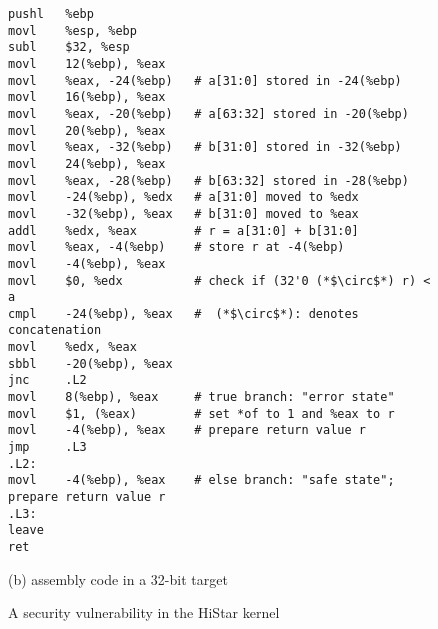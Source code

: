 \begin{figure}
\begin{lstlisting}
pushl   %ebp
movl    %esp, %ebp
subl    $32, %esp
movl    12(%ebp), %eax
movl    %eax, -24(%ebp)   # a[31:0] stored in -24(%ebp)
movl    16(%ebp), %eax
movl    %eax, -20(%ebp)   # a[63:32] stored in -20(%ebp)
movl    20(%ebp), %eax
movl    %eax, -32(%ebp)   # b[31:0] stored in -32(%ebp)
movl    24(%ebp), %eax
movl    %eax, -28(%ebp)   # b[63:32] stored in -28(%ebp)
movl    -24(%ebp), %edx   # a[31:0] moved to %edx
movl    -32(%ebp), %eax   # b[31:0] moved to %eax
addl    %edx, %eax        # r = a[31:0] + b[31:0]
movl    %eax, -4(%ebp)    # store r at -4(%ebp)
movl    -4(%ebp), %eax
movl    $0, %edx          # check if (32'0 (*$\circ$*) r) < a
cmpl    -24(%ebp), %eax   #  (*$\circ$*): denotes concatenation
movl    %edx, %eax
sbbl    -20(%ebp), %eax
jnc     .L2               
movl    8(%ebp), %eax     # true branch: "error state"
movl    $1, (%eax)        # set *of to 1 and %eax to r
movl    -4(%ebp), %eax    # prepare return value r
jmp     .L3
.L2:                  
movl    -4(%ebp), %eax    # else branch: "safe state"; prepare return value r
.L3:
leave
ret
\end{lstlisting}
\begin{center}
{\small (b) \ISA assembly code in a 32-bit target}
\end{center}
\caption{A security vulnerability in the HiStar kernel}
\label{fig:histar}
\end{figure}

